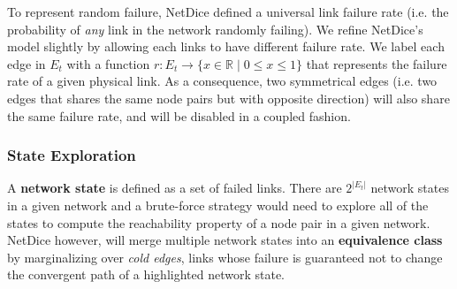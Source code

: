 \documentclass[10pt,sigconf,letterpaper,anonymous,nonacm]{acmart}
\begin{document}

To represent random failure, NetDice defined a universal link failure rate (i.e. 
the probability of \textit{any} link in the network randomly failing).
We refine NetDice's model slightly by allowing each links to have different failure rate.
We label each edge in $E_t$ with a function $r: E_t \rightarrow \{x \in \mathbb{R} \mid 0 \le x 
\le 1\}$ that represents the failure rate of a given physical link.
As a consequence, two symmetrical edges (i.e. two edges that shares the same node pairs but with 
opposite direction) will also share the same failure rate, and will be disabled in a coupled 
fashion.



\subsubsection{State Exploration}
A \textbf{network state} is defined as a set of failed links.
There are $2^{|E_t|}$ network states in a given network and a brute-force strategy 
would need to explore all of the states to compute the reachability property of a 
node pair in a given network. 
NetDice however, will merge multiple network states into an \textbf{equivalence class}
by marginalizing over \textit{cold edges}, links whose failure is guaranteed not to 
change the convergent path of a highlighted network state.
\end{document}
